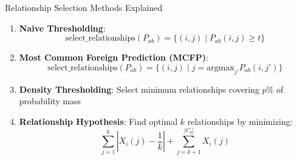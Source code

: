 \documentclass[aspectratio=169]{beamer}
\begin{document}
\begin{frame}{Relationship Selection Methods Explained}
    \begin{enumerate}
        \item \textbf{Naive Thresholding}:
              \begin{equation}
                  \text{select\_relationships}(P_{ab}) = \{(i, j) \mid P_{ab}(i, j) \geq t\}
              \end{equation}

        \item \textbf{Most Common Foreign Prediction (MCFP)}:
              \begin{equation}
                  \text{select\_relationships}(P_{ab}) = \{(i, j) \mid j = \text{argmax}_{j'} P_{ab}(i, j')\}
              \end{equation}

        \item \textbf{Density Thresholding}: Select minimum relationships covering $p\%$ of probability mass

        \item \textbf{Relationship Hypothesis}: Find optimal $k$ relationships by minimizing:
              \begin{equation}
                  \sum_{j=1}^k \left| X_i(j) - \frac{1}{k} \right| + \sum_{j=k+1}^{|C_b|} X_i(j)
              \end{equation}
    \end{enumerate}
\end{frame}
\end{document}
